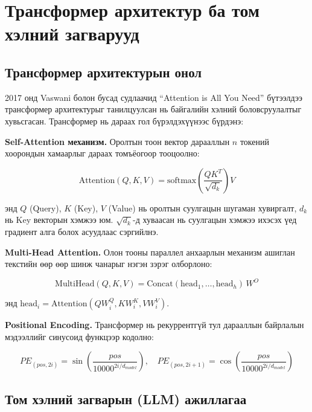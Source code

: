 \documentclass[12pt,a4paper]{report}
\begin{document}
\section{Трансформер архитектур ба том хэлний загварууд}

\subsection{Трансформер архитектурын онол}

2017 онд Vaswani болон бусад судлаачид ``Attention is All You Need'' \cite{vaswani2017} бүтээлдээ трансформер архитектурыг танилцуулсан нь байгалийн хэлний боловсруулалтыг хувьсгасан. Трансформер нь дараах гол бүрэлдэхүүнээс бүрдэнэ:

\textbf{Self-Attention механизм.} Оролтын тоон вектор дарааллын $n$ токений хоорондын хамаарлыг дараах томъёогоор тооцоолно:

\begin{equation}
\text{Attention}(Q, K, V) = \text{softmax}\!\left(\frac{QK^T}{\sqrt{d_k}}\right)V
\label{eq:attention}
\end{equation}

\noindent энд $Q$ (Query), $K$ (Key), $V$ (Value) нь оролтын суулгацын шугаман хувиргалт, $d_k$ нь Key векторын хэмжээ юм. $\sqrt{d_k}$-д хуваасан нь суулгацын хэмжээ ихэсэх үед градиент алга болох асуудлаас сэргийлнэ.

\textbf{Multi-Head Attention.} Олон тооны параллел анхаарлын механизм ашиглан текстийн өөр өөр шинж чанарыг нэгэн зэрэг олборлоно:

\begin{equation}
\text{MultiHead}(Q,K,V) = \text{Concat}(\text{head}_1,\ldots,\text{head}_h)\,W^O
\label{eq:multihead}
\end{equation}

\noindent энд $\text{head}_i = \text{Attention}(QW_i^Q, KW_i^K, VW_i^V)$.

\textbf{Positional Encoding.} Трансформер нь рекуррентгүй тул дарааллын байрлалын мэдээллийг синусоид функцээр кодолно:

\begin{equation}
PE_{(pos,2i)} = \sin\!\left(\frac{pos}{10000^{2i/d_{model}}}\right), \quad
PE_{(pos,2i+1)} = \cos\!\left(\frac{pos}{10000^{2i/d_{model}}}\right)
\label{eq:pos_enc}
\end{equation}

\subsection{Том хэлний загварын (LLM) ажиллагаа}
\end{document}
